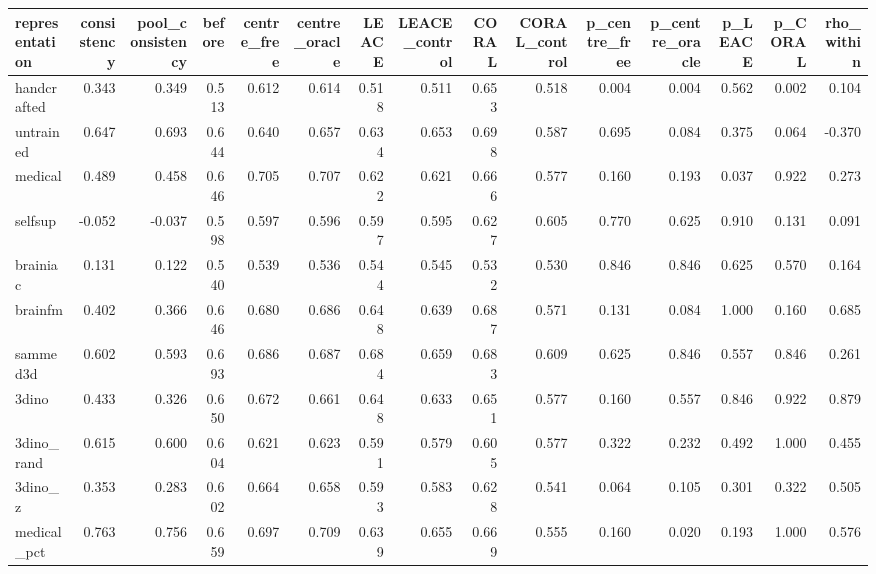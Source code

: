\begin{tabular}{lrrrrrrrrrrrrrr}
\toprule
representation & consistency & pool\_consistency & before & centre\_free & centre\_oracle & LEACE & LEACE\_control & CORAL & CORAL\_control & p\_centre\_free & p\_centre\_oracle & p\_LEACE & p\_CORAL & rho\_within \\
\midrule
handcrafted & 0.343 & 0.349 & 0.513 & 0.612 & 0.614 & 0.518 & 0.511 & 0.653 & 0.518 & 0.004 & 0.004 & 0.562 & 0.002 & 0.104 \\
untrained & 0.647 & 0.693 & 0.644 & 0.640 & 0.657 & 0.634 & 0.653 & 0.698 & 0.587 & 0.695 & 0.084 & 0.375 & 0.064 & -0.370 \\
medical & 0.489 & 0.458 & 0.646 & 0.705 & 0.707 & 0.622 & 0.621 & 0.666 & 0.577 & 0.160 & 0.193 & 0.037 & 0.922 & 0.273 \\
selfsup & -0.052 & -0.037 & 0.598 & 0.597 & 0.596 & 0.597 & 0.595 & 0.627 & 0.605 & 0.770 & 0.625 & 0.910 & 0.131 & 0.091 \\
brainiac & 0.131 & 0.122 & 0.540 & 0.539 & 0.536 & 0.544 & 0.545 & 0.532 & 0.530 & 0.846 & 0.846 & 0.625 & 0.570 & 0.164 \\
brainfm & 0.402 & 0.366 & 0.646 & 0.680 & 0.686 & 0.648 & 0.639 & 0.687 & 0.571 & 0.131 & 0.084 & 1.000 & 0.160 & 0.685 \\
sammed3d & 0.602 & 0.593 & 0.693 & 0.686 & 0.687 & 0.684 & 0.659 & 0.683 & 0.609 & 0.625 & 0.846 & 0.557 & 0.846 & 0.261 \\
3dino & 0.433 & 0.326 & 0.650 & 0.672 & 0.661 & 0.648 & 0.633 & 0.651 & 0.577 & 0.160 & 0.557 & 0.846 & 0.922 & 0.879 \\
3dino\_rand & 0.615 & 0.600 & 0.604 & 0.621 & 0.623 & 0.591 & 0.579 & 0.605 & 0.577 & 0.322 & 0.232 & 0.492 & 1.000 & 0.455 \\
3dino\_z & 0.353 & 0.283 & 0.602 & 0.664 & 0.658 & 0.593 & 0.583 & 0.628 & 0.541 & 0.064 & 0.105 & 0.301 & 0.322 & 0.505 \\
medical\_pct & 0.763 & 0.756 & 0.659 & 0.697 & 0.709 & 0.639 & 0.655 & 0.669 & 0.555 & 0.160 & 0.020 & 0.193 & 1.000 & 0.576 \\
\bottomrule
\end{tabular}
